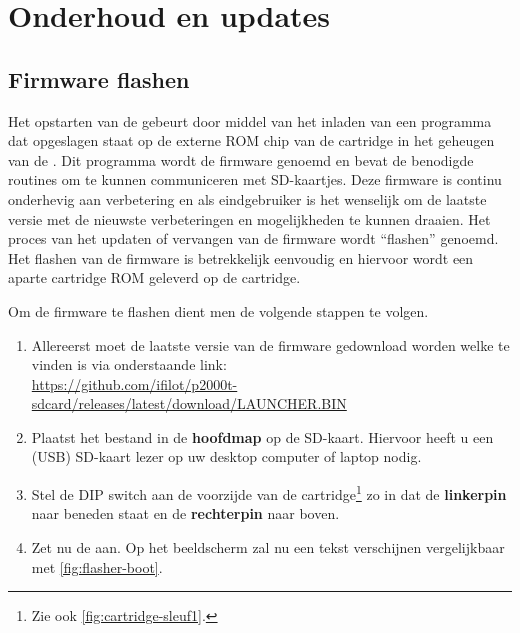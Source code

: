 \chapter{Onderhoud en updates}
\chapterpreamble

%
%
%
\section{Firmware flashen}
\label{sec:firmware-flash}


Het opstarten van de \product gebeurt door middel van het inladen van een programma dat opgeslagen staat op de externe ROM chip van de  cartridge in het geheugen van de . Dit programma wordt de firmware genoemd en bevat de benodigde routines om te kunnen communiceren met SD-kaartjes. Deze firmware is continu onderhevig aan verbetering en als eindgebruiker is het wenselijk om de laatste versie met de nieuwste verbeteringen en mogelijkheden te kunnen draaien. Het proces van het updaten of vervangen van de firmware wordt ``flashen'' genoemd. Het flashen van de firmware is betrekkelijk eenvoudig en hiervoor wordt een aparte cartridge ROM geleverd op de  cartridge.

Om de firmware te flashen dient men de volgende stappen te volgen. 

\begin{enumerate}[noitemsep]
    \item Allereerst moet de laatste versie van de firmware gedownload worden welke te vinden is via onderstaande link:\\
    \url{https://github.com/ifilot/p2000t-sdcard/releases/latest/download/LAUNCHER.BIN}
    \item Plaatst het bestand  in de \textbf{hoofdmap} op de SD-kaart. Hiervoor heeft u een (USB) SD-kaart lezer op uw desktop computer of laptop nodig.
    \item Stel de DIP switch aan de voorzijde van de  cartridge\footnote{Zie ook \cref{fig:cartridge-sleuf1}.} zo in dat de \textbf{linkerpin} naar beneden staat en de \textbf{rechterpin} naar boven.
    \item Zet nu de  aan. Op het beeldscherm zal nu een tekst verschijnen vergelijkbaar met \cref{fig:flasher-boot}.
\end{enumerate}

